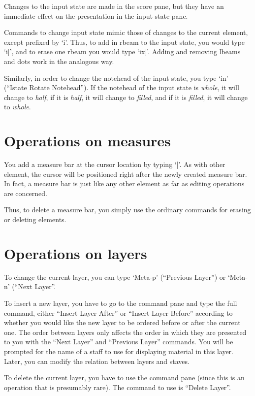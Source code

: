 \documentclass[11pt]{book}
\def\kbd#1{`#1'}
\def\command#1{``#1''}
\begin{document}
Changes to the input state are made in the score pane, but they have
an immediate effect on the presentation in the input state pane. 

Commands to change input state mimic those of changes to the current
element, except prefixed by \kbd{i}.  Thus, to add in rbeam to the
input state, you would type \kbd{i]}, and to erase one rbeam you would
  type \kbd{ix]}.  Adding and removing lbeams and dots work in the
    analogous way. 

Similarly, in order to change the notehead of the input state, you
type \kbd{in} (\command{Istate Rotate Notehead}).  If the notehead of
the input state is \emph{whole}, it will change to \emph{half}, if
it is \emph{half}, it will change to \emph{filled}, and if it is
\emph{filled}, it will change to \emph{whole}.

\chapter{Operations on measures}

You add a measure bar at the cursor location by typing \kbd{|}.  As
  with other element, the cursor will be positioned right after the
  newly created measure bar.  In fact, a measure bar is just like any
  other element as far as editing operations are concerned.

Thus, to delete a measure bar, you simply use the ordinary commands
for erasing or deleting elements.

\chapter{Operations on layers}

To change the current layer, you can type \kbd{Meta-p}
(\command{Previous Layer}) or \kbd{Meta-n} (\command{Next Layer}. 

To insert a new layer, you have to go to the command pane and type the
full command, either \command{Insert Layer After} or \command{Insert
  Layer Before} according to whether you would like the new layer to
be ordered before or after the current one.  The order between layers
only affects the order in which they are presented to you with the
\command{Next Layer} and \command{Previous Layer} commands.  You will
be  prompted for the name of a staff to use for displaying material in
this layer.  Later, you can modify the relation between layers and
staves. 

To delete the current layer, you have to use the command pane (since
this is an operation that is presumably rare).  The command to use is
\command{Delete Layer}.
\end{document}

